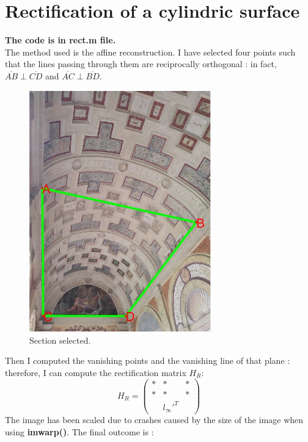 \documentclass[a4paper, 11pt, oneside, openright, english]{book}
\begin{document}
\section{Rectification of a cylindric surface}
\textbf{The code is in rect.m file.}\\
The method used is the affine reconstruction. I have selected four points such that the lines passing through them 
are reciprocally orthogonal : in fact, $\overline{AB} \perp \overline{CD} $ and $\overline{AC} \perp \overline{BD}$. 
\begin{figure}[H]
    \centering
    \includegraphics[width=0.7\textwidth]{../images/section.JPG}
    \caption{Section selected.}
\end{figure}
Then I computed the vanishing points and the vanishing line of that plane : therefore, I can compute the rectification matrix $H_R$:
\[
    H_R = 
\begin{pmatrix}
    * & * & * \\
    * & * & * \\
    &l_\infty'^{T}
\end{pmatrix}    
\]
The image has been scaled due to crashes caused by the size of the image when using \textbf{imwarp()}.
The final outcome is : 
\end{document}
